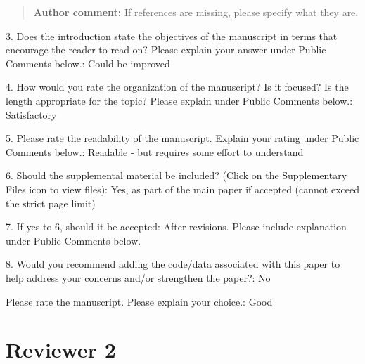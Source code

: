 \documentclass[10pt]{article}
\newcommand{\authorcomment}[1]{\begin{quote}\textbf{Author comment:} #1\end{quote}}
\begin{document}
\authorcomment{If references are missing, please specify what they are.}
\begin{spverbatim}

3. Does the introduction state the objectives of the manuscript in terms that encourage the reader to read on? Please explain your answer under Public Comments below.: Could be improved

4. How would you rate the organization of the manuscript? Is it focused? Is the length appropriate for the topic? Please explain under Public Comments below.: Satisfactory

5. Please rate the readability of the manuscript. Explain your rating under Public Comments below.: Readable - but requires some effort to understand

6. Should the supplemental material be included? (Click on the Supplementary Files icon to view files): Yes, as part of the main paper if accepted (cannot exceed the strict page limit)

7. If yes to 6, should it be accepted: After revisions.  Please include explanation under Public Comments below.

8. Would you recommend adding the code/data associated with this paper to help address your concerns and/or strengthen the paper?: No

Please rate the manuscript. Please explain your choice.: Good
\end{spverbatim}


\section{Reviewer 2}
\end{document}

